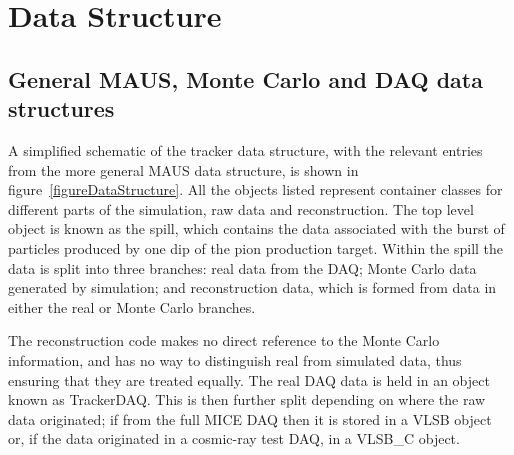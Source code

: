 \section{Data Structure}
\label{sec:DataStructure}

\subsection{General MAUS, Monte Carlo and DAQ data structures}
\label{subsec:GeneralDataStructure}
A simplified schematic of the tracker data structure, with the relevant entries from the more general MAUS data structure, is shown in figure~\ref{figureDataStructure}.  All the objects listed represent container classes for different parts of the simulation, raw data and reconstruction.  The top level object is known as the spill, which contains the data associated with the burst of particles produced by one dip of the pion production target.  Within the spill the data is split into three branches: real data from the DAQ; Monte Carlo data generated by simulation; and reconstruction data, which is formed from data in either the real or Monte Carlo branches. 

The reconstruction code makes no direct reference to the Monte Carlo information, and has no way to distinguish real from simulated data, thus ensuring that they are treated equally.  The real DAQ data is held in an object known as TrackerDAQ.  This is then further split depending on where the raw data originated; if from the full MICE DAQ then it is stored in a VLSB object or, if the data originated in a cosmic-ray test DAQ, in a VLSB\_C object.

